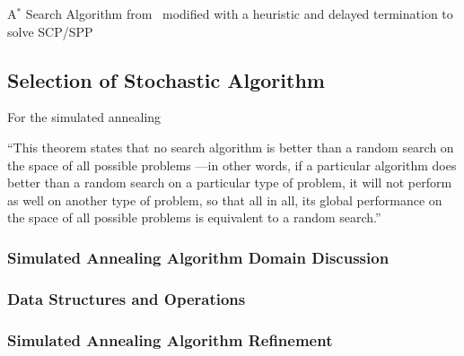 \documentclass[conference]{IEEEtran}
\begin{document}
\begin{algorithm}[ht!]
    \caption{A$^*$ Search Algorithm from~\cite{pearl1984} modified with a
    heuristic and delayed termination to solve SCP/SPP}
    \label{alg:astar}
\end{algorithm}


\subsection{Selection of Stochastic Algorithm}
For the simulated annealing

``This theorem states that no search algorithm is better than a random search
on the space of all possible problems —in other words, if a particular
algorithm does better than a random search on a particular type of problem, it
will not perform as well on another type of problem, so that all in all, its
global performance on the space of all possible problems is equivalent to a
random search.''~\cite{collet2007, wiki:nfl}

\subsubsection{Simulated Annealing Algorithm Domain Discussion}

\subsubsection{Data Structures and Operations}

\subsubsection{Simulated Annealing Algorithm Refinement}
\end{document}
